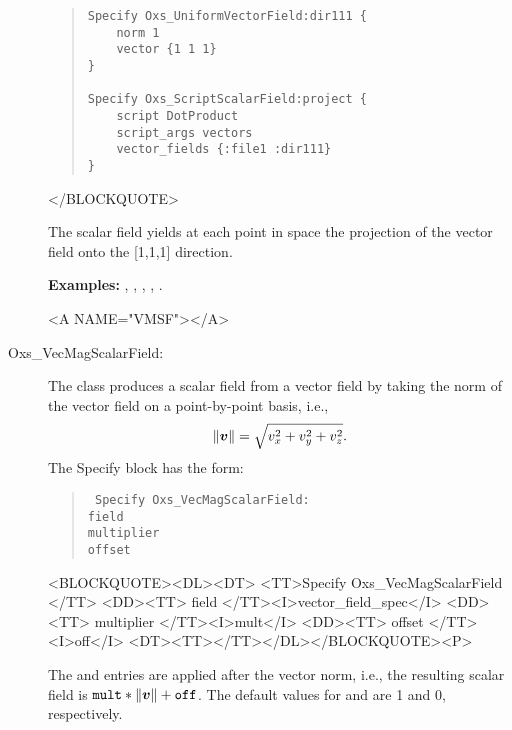 \begin{description}
\begin{quote}
\begin{verbatim}
Specify Oxs_UniformVectorField:dir111 {
    norm 1
    vector {1 1 1}
}

Specify Oxs_ScriptScalarField:project {
    script DotProduct
    script_args vectors
    vector_fields {:file1 :dir111}
}
\end{verbatim}
\end{quote}
\begin{rawhtml}</BLOCKQUOTE>\end{rawhtml}
The scalar field  yields at each point in space the
projection of the vector field  onto the [1,1,1] direction.

\textbf{Examples:} ,
, ,
, .

\begin{rawhtml}<A NAME="VMSF"></A>\end{rawhtml}%
%
\item[Oxs\_VecMagScalarField:]
The  class produces a scalar field
from a vector field by taking the norm of the vector field on a
point-by-point basis, i.e.,
\begin{displaymath}
   \|\mbox{\boldmath $v$}\| = \sqrt{v_x^2+v_y^2+v_z^2}.
\end{displaymath}
The Specify block has the form:
\begin{latexonly}
\begin{quote}\tt
Specify Oxs\_VecMagScalarField: \ocb\\
 \bi field \\
 \bi multiplier \\
 \bi offset \\
\ccb
\end{quote}
\end{latexonly}
\begin{rawhtml}<BLOCKQUOTE><DL><DT>
<TT>Specify Oxs_VecMagScalarField {</TT>
<DD><TT> field </TT><I>vector_field_spec</I>
<DD><TT> multiplier </TT><I>mult</I>
<DD><TT> offset </TT><I>off</I>
<DT><TT>}</TT></DL></BLOCKQUOTE><P>
\end{rawhtml}
The  and  entries are applied
after the vector norm, i.e., the resulting scalar field is
$\texttt{mult}\ast\|\mbox{\boldmath $v$}\|+\texttt{off}$.  The default values
for  and  are 1 and 0, respectively.


\end{description}
